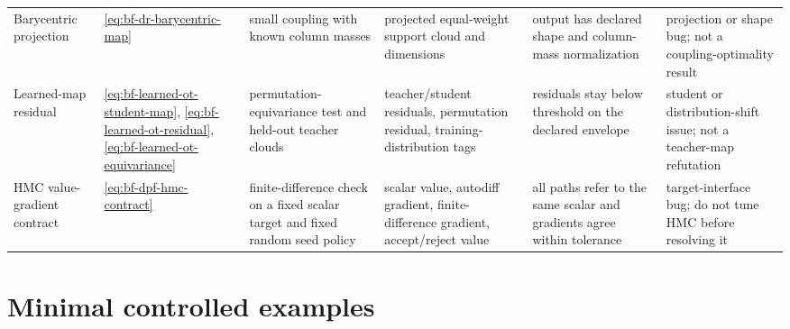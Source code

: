 \begin{center}
\begin{longtable}{@{}p{} p{} p{} p{} p{} p{}@{}}
Barycentric projection &
\eqref{eq:bf-dr-barycentric-map} &
small coupling with known column masses &
projected equal-weight support cloud and dimensions &
output has declared shape and column-mass normalization &
projection or shape bug; not a coupling-optimality result \\
Learned-map residual &
\eqref{eq:bf-learned-ot-student-map}, \eqref{eq:bf-learned-ot-residual}, \eqref{eq:bf-learned-ot-equivariance} &
permutation-equivariance test and held-out teacher clouds &
teacher/student residuals, permutation residual, training-distribution tags &
residuals stay below threshold on the declared envelope &
student or distribution-shift issue; not a teacher-map refutation \\
HMC value-gradient contract &
\eqref{eq:bf-dpf-hmc-contract} &
finite-difference check on a fixed scalar target and fixed random seed policy &
scalar value, autodiff gradient, finite-difference gradient, accept/reject value &
all paths refer to the same scalar and gradients agree within tolerance &
target-interface bug; do not tune HMC before resolving it \\
\end{longtable}
\end{center}

\section{Minimal controlled examples}
\label{sec:bf-dpf-debug-controlled-examples}

